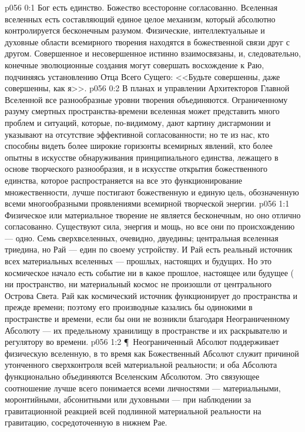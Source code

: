 \vs p056 0:1 Бог есть единство. Божество всесторонне согласованно. Вселенная вселенных есть составляющий единое целое механизм, который абсолютно контролируется бесконечным разумом. Физические, интеллектуальные и духовные области всемирного творения находятся в божественной связи друг с другом. Совершенное и несовершенное истинно взаимосвязаны, и, следовательно, конечные эволюционные создания могут совершать восхождение к Раю, подчиняясь установлению Отца Всего Сущего: <<Будьте совершенны, даже совершенны, как я>>.
\vs p056 0:2 В планах и управлении Архитекторов Главной Вселенной все разнообразные уровни творения объединяются. Ограниченному разуму смертных пространства\hyp{}времени вселенная может представить много проблем и ситуаций, которые, по\hyp{}видимому, дают картину дисгармонии и указывают на отсутствие эффективной согласованности; но те из нас, кто способны видеть более широкие горизонты всемирных явлений, кто более опытны в искусстве обнаруживания принципиального единства, лежащего в основе творческого разнообразия, и в искусстве открытия божественного единства, которое распространяется на все это функционирование множественности, лучше постигают божественную и единую цель, обозначенную всеми многообразными проявлениями всемирной творческой энергии.
\vs p056 1:1 Физическое или материальное творение не является бесконечным, но оно отлично согласованно. Существуют сила, энергия и мощь, но все они по происхождению --- одно. Семь сверхвселенных, очевидно, двуедины; центральная вселенная триедина, но Рай --- един по своему устройству. И Рай есть реальный источник всех материальных вселенных --- прошлых, настоящих и будущих. Но это космическое начало есть событие ни в какое  прошлое, настоящее или будущее ( ни пространство, ни материальный космос не произошли от центрального Острова Света. Рай как космический источник функционирует до пространства и прежде времени; поэтому его производные казались бы одинокими в пространстве и времени, если бы они не возникли благодаря Неограниченному Абсолюту --- их предельному хранилищу в пространстве и их раскрывателю и регулятору во времени.
\vs p056 1:2 \P\ Неограниченный Абсолют поддерживает физическую вселенную, в то время как Божественный Абсолют служит причиной утонченного сверхконтроля всей материальной реальности; и оба Абсолюта функционально объединяются Вселенским Абсолютом. Это связующее соотношение лучше всего понимается всеми личностями --- материальными, моронтийными, абсонитными или духовными --- при наблюдении за гравитационной реакцией всей подлинной материальной реальности на гравитацию, сосредоточенную в нижнем Рае.
